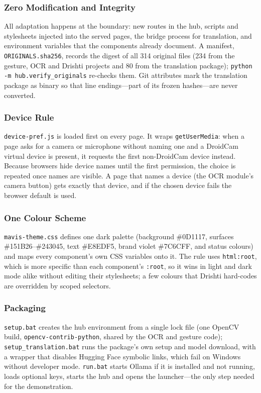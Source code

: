 \documentclass[12pt,singleside,a4paper]{article}
\begin{document}
\subsubsection{Zero Modification and Integrity}
All adaptation happens at the boundary: new routes in the hub, scripts and stylesheets injected into the served pages, the bridge process for translation, and environment variables that the components already document. A manifest, \texttt{ORIGINALS.sha256}, records the digest of all 314 original files (234 from the gesture, OCR and Drishti projects and 80 from the translation package); \texttt{python -m hub.verify\_originals} re-checks them. Git attributes mark the translation package as binary so that line endings---part of its frozen hashes---are never converted.

\subsubsection{Device Rule}
\texttt{device-pref.js} is loaded first on every page. It wraps \texttt{getUserMedia}: when a page asks for a camera or microphone without naming one and a DroidCam virtual device is present, it requests the first non-DroidCam device instead. Because browsers hide device names until the first permission, the choice is repeated once names are visible. A page that names a device (the OCR module's camera button) gets exactly that device, and if the chosen device fails the browser default is used.

\subsubsection{One Colour Scheme}
\texttt{mavis-theme.css} defines one dark palette (background \#0D1117, surfaces \#151B26--\#243045, text \#E8EDF5, brand violet \#7C6CFF, and status colours) and maps every component's own CSS variables onto it. The rule uses \texttt{html:root}, which is more specific than each component's \texttt{:root}, so it wins in light and dark mode alike without editing their stylesheets; a few colours that Drishti hard-codes are overridden by scoped selectors.

\subsubsection{Packaging}
\texttt{setup.bat} creates the hub environment from a single lock file (one OpenCV build, \texttt{opencv-contrib-python}, shared by the OCR and gesture code); \texttt{setup\_translation.bat} runs the package's own setup and model download, with a wrapper that disables Hugging Face symbolic links, which fail on Windows without developer mode. \texttt{run.bat} starts Ollama if it is installed and not running, loads optional keys, starts the hub and opens the launcher---the only step needed for the demonstration.
\end{document}
